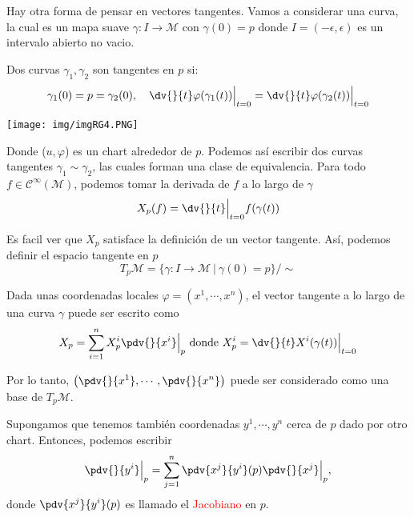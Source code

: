 \documentclass[../main]{subfiles}
\begin{document}
Hay otra forma de pensar en vectores tangentes. Vamos a considerar una curva, la cual es un mapa suave $\gamma:I \rightarrow \mathcal{M}$ con $\gamma(0)=p$ donde $I=(-\epsilon, \epsilon)$ es un intervalo abierto no vacio. 

Dos curvas $\gamma_1, \gamma_2$ son tangentes en $p$ si:
\begin{equation}
    \gamma_1(0)=p=\gamma_2(0),\quad \dv{}{t}\varphi(\gamma_1(t))\Big{|}_{t=0}=\dv{}{t}\varphi(\gamma_2(t))\Big{|}_{t=0}
\end{equation}
\begin{center}
    \texttt{[image: img/imgRG4.PNG]}
\end{center}

Donde ($u, \varphi$) es un chart alrededor de $p$. Podemos así escribir dos curvas tangentes $\gamma_1 \sim \gamma_2$, las cuales forman una clase de equivalencia. Para todo $f \in \mathcal{C}^{\infty}(\mathcal{M})$, podemos tomar la derivada de $f$ a lo largo de $\gamma$
\begin{equation}
    X_p(f)=\dv{}{t}\Big{|}_{t=0} f(\gamma(t))
\end{equation}

Es facil ver que $X_p$ satisface la definición de un vector tangente. Así, podemos definir el espacio tangente en $p$
\begin{equation}
    T_p \mathcal{M}=\{\gamma: I\rightarrow \mathcal{M}\ | \ \gamma(0)=p\}/\sim
\end{equation}

Dada unas coordenadas locales $\varphi=(x^1, \cdots, x^n)$, el vector tangente a lo largo de una curva $\gamma$ puede ser escrito como 
\begin{equation}
    X_p=\sum_{i=1}^n X^{i}_p \pdv{}{x^{i}}\Big{|}_p \ \text{donde} \ X^{i}_p=\dv{}{t}X^{i}(\gamma(t))\Big{|}_{t=0}
\end{equation}

Por lo tanto, $\left(\displaystyle \pdv{}{x^1}, \cdots, \pdv{}{x^n}\right)$ puede ser considerado como una base de $T_p\mathcal{M}$.

Supongamos que tenemos también coordenadas $y^1, \cdots, y^n$ cerca de $p$ dado por otro chart. Entonces, podemos escribir 
\begin{equation}
    \pdv{}{y^{i}}\Big{|}_p=\sum_{j=1}^n \pdv{x^j}{y^{i}}(p)\pdv{}{x^j}\Big{|}_p,
\end{equation}
donde $\displaystyle \pdv{x^j}{y^{i}}(p)$ es llamado el \textcolor{red}{Jacobiano} en $p$.
\end{document}
